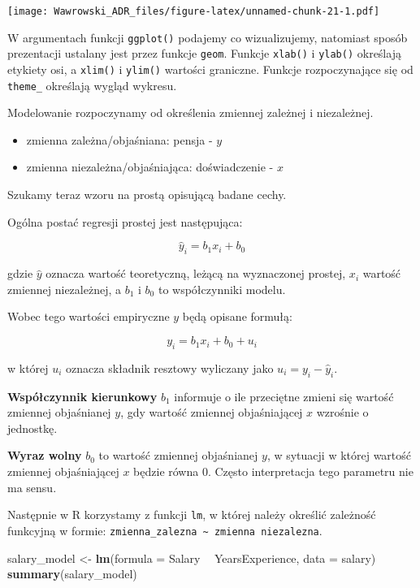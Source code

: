 \documentclass[]{book}
\newenvironment{Shaded}{\begin{snugshade}}{\end{snugshade}}
\newcommand{\DataTypeTok}[1]{\textcolor[rgb]{0.13,0.29,0.53}{#1}}
\newcommand{\KeywordTok}[1]{\textcolor[rgb]{0.13,0.29,0.53}{\textbf{#1}}}
\newcommand{\NormalTok}[1]{#1}
\newcommand{\OperatorTok}[1]{\textcolor[rgb]{0.81,0.36,0.00}{\textbf{#1}}}
\newcommand{\StringTok}[1]{\textcolor[rgb]{0.31,0.60,0.02}{#1}}
\providecommand{\tightlist}{%
  \setlength{\itemsep}{0pt}\setlength{\parskip}{0pt}}
\begin{document}
\texttt{[image: Wawrowski\_ADR\_files/figure-latex/unnamed-chunk-21-1.pdf]}

W argumentach funkcji \texttt{ggplot()} podajemy co wizualizujemy, natomiast sposób prezentacji ustalany jest przez funkcje \texttt{geom}. Funkcje \texttt{xlab()} i \texttt{ylab()} określają etykiety osi, a \texttt{xlim()} i \texttt{ylim()} wartości graniczne. Funkcje rozpoczynające się od \texttt{theme\_} określają wygląd wykresu.

Modelowanie rozpoczynamy od określenia zmiennej zależnej i niezależnej.

\begin{itemize}
\tightlist
\item
  zmienna zależna/objaśniana: pensja - \(y\)
\item
  zmienna niezależna/objaśniająca: doświadczenie - \(x\)
\end{itemize}

Szukamy teraz wzoru na prostą opisującą badane cechy.

Ogólna postać regresji prostej jest następująca:

\[\hat{y}_{i}=b_{1}x_{i}+b_{0}\]

gdzie \(\hat{y}\) oznacza wartość teoretyczną, leżącą na wyznaczonej prostej, \(x_i\) wartość zmiennej niezależnej, a \(b_1\) i \(b_0\) to współczynniki modelu.

Wobec tego wartości empiryczne \(y\) będą opisane formułą:

\[y_{i}=b_{1}x_{i}+b_{0}+u_{i}\]

w której \(u_i\) oznacza składnik resztowy wyliczany jako \(u_{i}=y_{i}-\hat{y}_{i}\).

\textbf{Współczynnik kierunkowy} \(b_1\) informuje o ile przeciętne zmieni się wartość zmiennej objaśnianej \(y\), gdy wartość zmiennej objaśniającej \(x\) wzrośnie o jednostkę.

\textbf{Wyraz wolny} \(b_0\) to wartość zmiennej objaśnianej \(y\), w sytuacji w której wartość zmiennej objaśniającej \(x\) będzie równa 0. Często interpretacja tego parametru nie ma sensu.

Następnie w R korzystamy z funkcji \texttt{lm}, w której należy określić zależność funkcyjną w formie: \texttt{zmienna\_zalezna\ \textasciitilde{}\ zmienna\ niezalezna}.

\begin{Shaded}
\begin{Highlighting}[]
\NormalTok{salary_model <-}\StringTok{ }\KeywordTok{lm}\NormalTok{(}\DataTypeTok{formula =}\NormalTok{ Salary }\OperatorTok{~}\StringTok{ }\NormalTok{YearsExperience, }\DataTypeTok{data =}\NormalTok{ salary)}
\KeywordTok{summary}\NormalTok{(salary_model)}
\end{Highlighting}
\end{Shaded}
\end{document}
